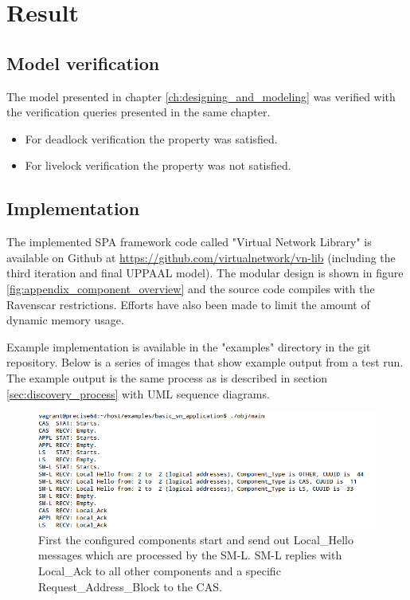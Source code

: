 \chapter{Result}\label{ch:result}
\section{Model verification}
The model presented in chapter \ref{ch:designing_and_modeling} was verified
with the verification queries presented in the same chapter.

\begin{itemize}
    \item For deadlock verification the property was satisfied.
    \item For livelock verification the property was not satisfied.
\end{itemize}


\section{Implementation}
The implemented SPA framework code called "Virtual Network Library" is
available on Github at \url{https://github.com/virtualnetwork/vn-lib}
(including the third iteration and final UPPAAL model). The
modular design is shown in figure \ref{fig:appendix_component_overview} and the
source code compiles with the Ravenscar restrictions. Efforts have also been
made to limit the amount of dynamic memory usage.

Example implementation is available in the "examples" directory in the git
repository. Below is a series of images that show example output from a test
run. The example output is the same process as is described in section
\ref{sec:discovery_process} with UML sequence diagrams.

\begin{figure}[ht]
    \centering
    \includegraphics[width=\textwidth]{figures/code_part_1}
    \caption{First the configured components start and send out Local\_Hello
    messages which are processed by the SM-L. SM-L replies with Local\_Ack to
    all other components and a specific Request\_Address\_Block to the CAS.}
    \label{fig:code_part_1}
\end{figure}

